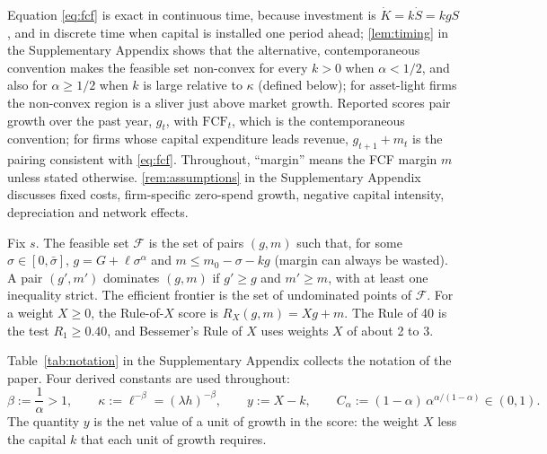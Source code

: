 Equation \eqref{eq:fcf} is exact in continuous time, because investment is $\dot K=k\dot S=kgS$, and in discrete time when capital is installed one period ahead; \autoref{lem:timing} in the Supplementary Appendix shows that the alternative, contemporaneous convention makes the feasible set non-convex for every $k>0$ when $\alpha<1/2$, and also for $\alpha\ge1/2$ when $k$ is large relative to $\kappa$ (defined below); for asset-light firms the non-convex region is a sliver just above market growth. Reported scores pair growth over the past year, $g_t$, with $\text{FCF}_t$, which is the contemporaneous convention; for firms whose capital expenditure leads revenue, $g_{t+1}+m_t$ is the pairing consistent with \eqref{eq:fcf}. Throughout, ``margin'' means the FCF margin $m$ unless stated otherwise. \autoref{rem:assumptions} in the Supplementary Appendix discusses fixed costs, firm-specific zero-spend growth, negative capital intensity, depreciation and network effects.

\begin{definition}\label{def:frontier}
Fix $s$. The feasible set $\mathcal F$ is the set of pairs $(g,m)$ such that, for some $\sigma\in[0,\bar\sigma]$, $g=G+\ell\sigma^{\alpha}$ and $m\le m_0-\sigma-kg$ (margin can always be wasted). A pair $(g',m')$ dominates $(g,m)$ if $g'\ge g$ and $m'\ge m$, with at least one inequality strict. The efficient frontier is the set of undominated points of $\mathcal F$. For a weight $X\ge 0$, the Rule-of-$X$ score is $R_X(g,m)=Xg+m$. The Rule of 40 is the test $R_1\ge 0.40$, and Bessemer's Rule of $X$ uses weights $X$ of about 2 to 3.
\end{definition}

Table~\ref{tab:notation} in the Supplementary Appendix collects the notation of the paper. Four derived constants are used throughout:
\begin{equation}\label{eq:constants}
\beta:=\frac1\alpha>1,\qquad \kappa:=\ell^{-\beta}=(\lambda h)^{-\beta},\qquad y:=X-k,\qquad C_\alpha:=(1-\alpha)\,\alpha^{\alpha/(1-\alpha)}\in(0,1).
\end{equation}
The quantity $y$ is the net value of a unit of growth in the score: the weight $X$ less the capital $k$ that each unit of growth requires.


